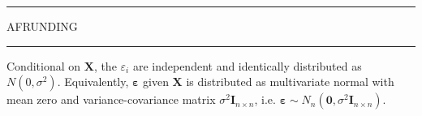 \hrule
\begin{center}
AFRUNDING
\end{center}
\hrule
\begin{assumption} \label{as:normality_of_errors}
    Conditional on $\mathbf{X}$, the $\varepsilon_i$ are independent and identically distributed as $N(0, \sigma^2)$. Equivalently, $\boldsymbol{\varepsilon}$ given $\mathbf{X}$ is distributed as multivariate normal with mean zero and variance-covariance matrix $\sigma^2 \mathbf{I}_{n \times n}$, i.e. $\boldsymbol{\varepsilon} \sim N_n(\mathbf{0}, \sigma^2 \mathbf{I}_{n \times n})$.
\end{assumption}